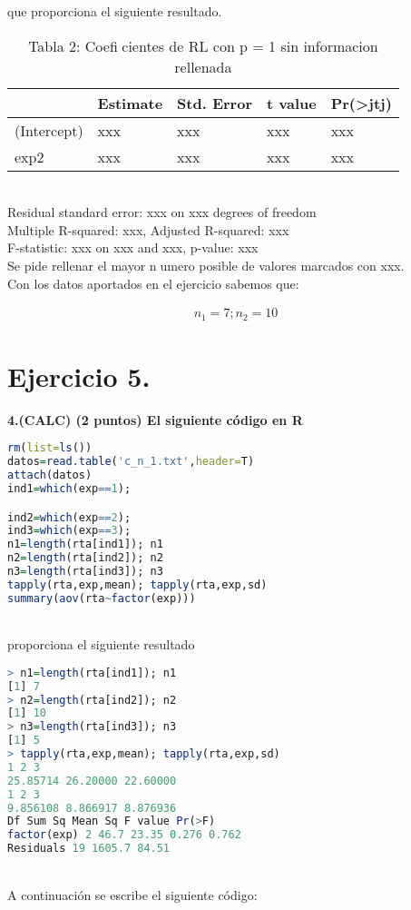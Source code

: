 \documentclass[12pt,spanish]{article}
\begin{document}
que proporciona el siguiente resultado.

\begin{table}[]
\begin{tabular}{@{}lllll@{}}
\toprule
            & Estimate & Std. Error & t value & Pr(\textgreater jtj) \\ \midrule
(Intercept) & xxx      & xxx        & xxx     & xxx                  \\
exp2        & xxx      & xxx        & xxx     & xxx                  \\ \bottomrule
\end{tabular}
\caption{Tabla 2: Coeficientes de RL con p = 1 sin informacion rellenada}
\end{table}
\\
Residual standard error: xxx on xxx degrees of freedom \\
Multiple R-squared: xxx, Adjusted R-squared: xxx \\
F-statistic: xxx on xxx and xxx, p-value: xxx \\
Se pide rellenar el mayor numero posible de valores marcados con xxx. \\

Con los datos aportados en el ejercicio sabemos que:

\begin{equation}
		\begin{aligned}
 n_1 = 7 ;   n_2 = 10
  
 

 	\end{aligned}
	\end{equation}


\part*{Ejercicio 5.}	
		\textbf{4.(CALC) (2 puntos) El siguiente código en R}\\
\begin{lstlisting}[language=R]
rm(list=ls())
datos=read.table('c_n_1.txt',header=T)
attach(datos)
ind1=which(exp==1);

ind2=which(exp==2);
ind3=which(exp==3);
n1=length(rta[ind1]); n1
n2=length(rta[ind2]); n2
n3=length(rta[ind3]); n3
tapply(rta,exp,mean); tapply(rta,exp,sd)
summary(aov(rta~factor(exp)))
\end{lstlisting}	
\\
proporciona el siguiente resultado\\


\begin{lstlisting}[language=R]
> n1=length(rta[ind1]); n1
[1] 7
> n2=length(rta[ind2]); n2
[1] 10
> n3=length(rta[ind3]); n3
[1] 5
> tapply(rta,exp,mean); tapply(rta,exp,sd)
1 2 3
25.85714 26.20000 22.60000
1 2 3
9.856108 8.866917 8.876936
Df Sum Sq Mean Sq F value Pr(>F)
factor(exp) 2 46.7 23.35 0.276 0.762
Residuals 19 1605.7 84.51
\end{lstlisting}
\\
A continuación se escribe el siguiente código:\\
\end{document}
